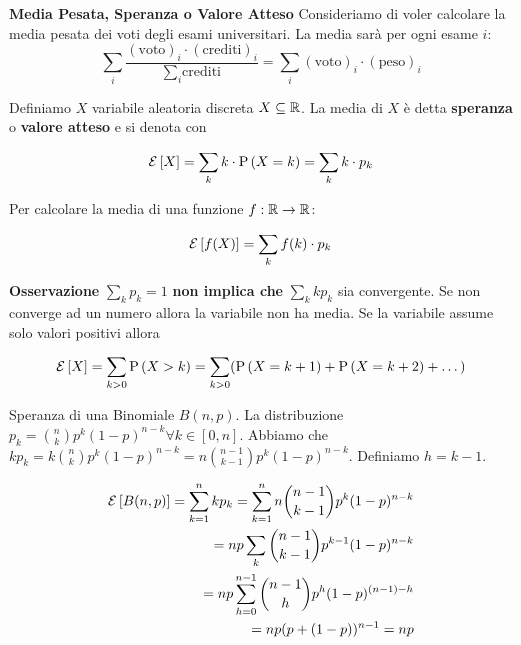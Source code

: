\begin{defn}
	\textbf{Media Pesata, Speranza o Valore Atteso}
	Consideriamo di voler calcolare la media pesata dei voti degli esami universitari. La media sarà per ogni esame $ i $:
	\begin{equation*}
	\sum_{i} \dfrac{(\text{voto})_i \cdot (\text{crediti})_i }{\sum_{i} \text{crediti}} = \sum_{i} (\text{voto})_i \cdot (\text{peso})_i
	\end{equation*}
	
	Definiamo $ X $ variabile aleatoria discreta $ X \subseteq \mathbb{R} $. La media di $ X $ è detta \textbf{speranza} o \textbf{valore atteso} e si denota con
	
	\begin{equation*}
	\mathcal{E}\left[X\right] = \sum_{k} k \cdot \text{P}\left(X = k\right) = \sum_{k} k \cdot p_k
	\end{equation*}
	
	Per calcolare la media di una funzione $ f : \mathbb{R} \to \mathbb{R} $:
	
	\begin{equation*}
	\mathcal{E}\left[f(X)\right] = \sum_{k} f(k) \cdot p_k
	\end{equation*}
	
	\textbf{Osservazione} $\sum_{k} p_k = 1 $ \textbf{non implica che} $ \sum_{k} k p_k $ sia convergente. Se non converge ad un numero allora la variabile non ha media. Se la variabile assume solo valori positivi allora
	
	\begin{equation*}
	\mathcal{E}\left[X\right] = \sum_{k>0} \text{P}\left(X > k\right) = \sum_{k>0} (\text{P}\left(X = k+1\right) + \text{P}\left(X = k+2\right) + \dots)
	\end{equation*}
	
\end{defn}

\begin{defn}
	Speranza di una Binomiale $ B(n,p) $. La distribuzione $ p_k = \binom{n}{k}p^k(1-p)^{n-k}  \forall k \in [0,n] $. Abbiamo che $ kp_k = k \binom{n}{k}p^k (1-p)^{n-k} = n \binom{n-1}{k-1} p^k(1-p)^{n-k} $. Definiamo $ h = k-1 $.
	
	\begin{equation*}
		\begin{aligned}
			\mathcal{E}\left[B(n,p)\right] = \sum_{k=1}^{n} kp_k = \sum_{k=1}^{n} n \binom{n-1}{k-1} p^k(1-p)^{n-k} \\
			= np \sum_{k} \binom{n-1}{k-1}p^{k-1}(1-p)^{n-k} \\
			= np \sum_{h=0}^{n-1} \binom{n-1}{h} p^h(1-p)^{(n-1) - h } \\
			= np(p+(1-p))^{n-1} = np
		\end{aligned}
	\end{equation*}

\end{defn}

